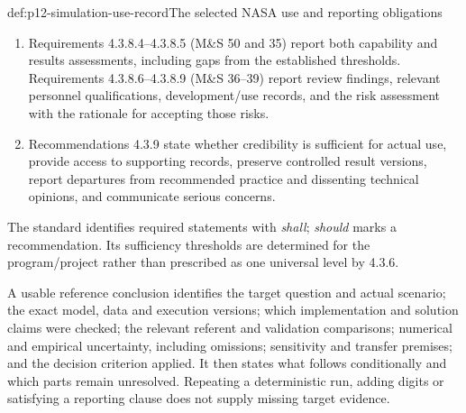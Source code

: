 \begin{hbmethod}{def:p12-simulation-use-record}{The selected NASA use and reporting obligations}
\begin{enumerate}
      also report the processes used to obtain the characterization.
      The explicit-unavailability option supplies no numerical bound.
\item Requirements 4.3.8.4--4.3.8.5 (M\&S 50 and 35) report both
      capability and results assessments, including gaps from
      the established thresholds. Requirements 4.3.8.6--4.3.8.9
      (M\&S 36--39) report review findings, relevant personnel
      qualifications, development/use records, and the risk
      assessment with the rationale for accepting those risks.
\item Recommendations 4.3.9 state whether credibility is sufficient
      for actual use, provide access to supporting records,
      preserve controlled result versions, report departures from
      recommended practice and dissenting technical opinions, and
      communicate serious concerns.
\end{enumerate}
The standard identifies required statements with \emph{shall};
\emph{should} marks a recommendation. Its sufficiency thresholds
are determined for the program/project rather than prescribed as
one universal level by 4.3.6.
\cite[Sections 1.2.4--1.2.5 and 4.3.1--4.3.9]{NASA7009B2024}
\end{hbmethod}

A usable reference conclusion identifies the target question and
actual scenario; the exact model, data and execution versions; which
implementation and solution claims were checked; the relevant
referent and validation comparisons; numerical and empirical
uncertainty, including omissions; sensitivity and transfer premises;
and the decision criterion applied. It then states what follows
conditionally and which parts remain unresolved. Repeating a
deterministic run, adding digits or satisfying a reporting clause
does not supply missing target evidence.
